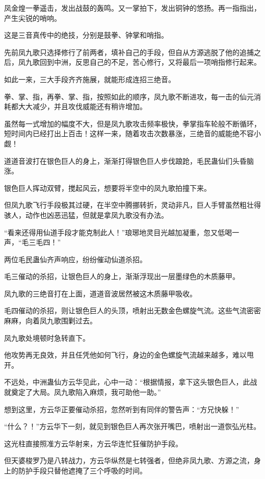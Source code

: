 \begin{this_body}
凤金煌一拳遥击，发出战鼓的轰鸣。又一掌拍下，发出铜钟的悠扬。再一指指出，产生尖锐的哨响。

这是三音真传中的绝技，分别是鼓拳、钟掌和哨指。

先前凤九歌只选择修行了前两者，填补自己的手段，但自从方源逃脱了他的追捕之后，凤九歌回到中洲，反思自己的不足，苦心修行，又将最后一项哨指修行起来。

如此一来，三大手段齐齐施展，就能形成连招三绝音。

拳、掌、指，再拳、掌、指，按照如此的顺序，凤九歌不断进攻，每一击的仙元消耗都大大减少，并且攻伐威能还有稍许增加。

虽然每一式增加的幅度不大，但是凤九歌攻击频率极快，拳掌指车轮般不断循环，短时间内已经打出上百击！这样一来，随着攻击次数暴涨，三绝音的威能绝不容小觑！

道道音波打在银色巨人的身上，渐渐打得银色巨人步伐踉跄，毛民蛊仙们头昏脑涨。

银色巨人挥动双臂，搅起风云，想要将半空中的凤九歌拍撞下来。

但凤九歌飞行手段极其过硬，在半空中腾挪转折，灵动非凡，巨人手臂虽然粗壮得骇人，动作也凶恶迅猛，但就是拿凤九歌没有办法。

“看来还得用仙道手段才能克制此人！”琅琊地灵目光越加凝重，忽又低喝一声，“毛三毛四！”

两位毛民蛊仙齐声响应，纷纷催动仙道杀招。

毛三催动的杀招，让银色巨人的身上，渐渐浮现出一层墨绿色的木质藤甲。

凤九歌的三绝音打在上面，道道音波居然被这木质藤甲吸收。

毛四催动的杀招，则让银色巨人的头顶，喷射出无数金色螺旋气流。这些气流密密麻麻，向着凤九歌围剿过去。

凤九歌处境顿时急转直下。

他攻势再无良效，并且任凭他如何飞行，身边的金色螺旋气流越来越多，难以甩开。

不远处，中洲蛊仙方云华见此，心中一动：“根据情报，拿下这头银色巨人，此战就奠定了大局。凤九歌陷入麻烦，我可助他一助。”

想到这里，方云华正要催动杀招，忽然听到有同伴的警告声：“方兄快躲！”

“什么？！”方云华下一刻，就见到银色巨人再次张开嘴巴，喷射出一道恢弘光柱。

这光柱直接照准方云华射来，方云华连忙狂催防护手段。

但天婆梭罗乃是八转战力，方云华纵然是七转强者，但绝非凤九歌、方源之流，身上的防护手段只替他遮掩了三个呼吸的时间。


\end{this_body}
